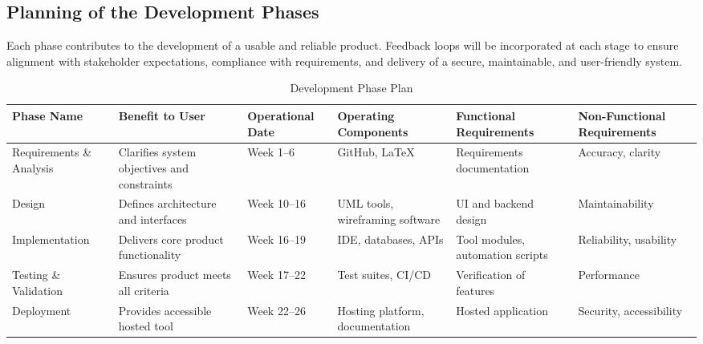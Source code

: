 \documentclass[12pt]{article}
\newcommand{\lips}{\textit{Insert your content here.}}
\begin{document}
\subsection{Planning of the Development Phases}

Each phase contributes to the development of a usable and reliable product. Feedback loops will be incorporated at each stage to ensure alignment with stakeholder expectations, compliance with requirements, and delivery of a secure, maintainable, and user-friendly system.

\begin{table}[h!]
\centering
\caption{Development Phase Plan}
\begin{tabularx}{\textwidth}{lXlXlX}
\toprule
\textbf{Phase Name} & \textbf{Benefit to User} & \textbf{Operational Date} & \textbf{Operating Components} & \textbf{Functional Requirements} & \textbf{Non-Functional Requirements} \\
\midrule
Requirements \& Analysis & Clarifies system objectives and constraints & Week 1–6 & GitHub, LaTeX & Requirements documentation & Accuracy, clarity \\
Design & Defines architecture and interfaces & Week 10–16 & UML tools, wireframing software & UI and backend design & Maintainability \\
Implementation & Delivers core product functionality & Week 16–19 & IDE, databases, APIs & Tool modules, automation scripts & Reliability, usability \\
Testing \& Validation & Ensures product meets all criteria & Week 17–22 & Test suites, CI/CD & Verification of features & Performance \\
Deployment & Provides accessible hosted tool & Week 22–26 & Hosting platform, documentation & Hosted application & Security, accessibility \\
\bottomrule
\end{tabularx}
\end{table}


\end{document}
